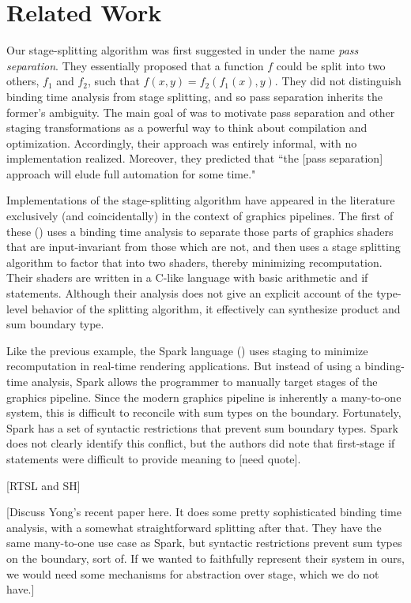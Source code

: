 


\section{Related Work}

Our stage-splitting algorithm was first suggested in \cite{jorring86} under the name {\em pass separation}.  They essentially proposed that a function $f$ could be split into two others, $f_1$ and $f_2$, such that $f(x,y)=f_2(f_1(x),y)$.  They did not distinguish binding time analysis from stage splitting, and so pass separation inherits the former's ambiguity.  The main goal of \cite{jorring86} was to motivate pass separation and other staging transformations as a powerful way to think about compilation and optimization.  Accordingly, their approach was entirely informal, with no implementation realized.  Moreover, they predicted that ``the [pass separation] approach will elude full automation for some time."  

Implementations of the stage-splitting algorithm have appeared in the literature exclusively (and coincidentally) in the context of graphics pipelines.  The first of these (\cite{knoblock96}) uses a binding time analysis to separate those parts of graphics shaders that are input-invariant from those which are not, and then uses a stage splitting algorithm to factor that into two shaders, thereby minimizing recomputation.  Their shaders are written in a C-like language with basic arithmetic and if statements.  Although their analysis does not give an explicit account of the type-level behavior of the splitting algorithm, it effectively can synthesize product and sum boundary type.  

Like the previous example, the Spark language (\cite{sparkThesis}) uses staging to minimize recomputation in real-time rendering applications.  But instead of using a binding-time analysis, Spark allows the programmer to manually target stages of the graphics pipeline.  Since the modern graphics pipeline is inherently a many-to-one system, this is difficult to reconcile with sum types on the boundary.  Fortunately, Spark has a set of syntactic restrictions that prevent sum boundary types.  Spark does not clearly identify this conflict, but the authors did note that first-stage if statements were difficult to provide meaning to [need quote].

[RTSL and SH]

[Discuss Yong's recent paper here.  It does some pretty sophisticated binding time analysis, with a somewhat straightforward splitting after that.  They have the same many-to-one use case as Spark, but syntactic restrictions prevent sum types on the boundary, sort of.  If we wanted to faithfully represent their system in ours, we would need some mechanisms for abstraction over stage, which we do not have.]

